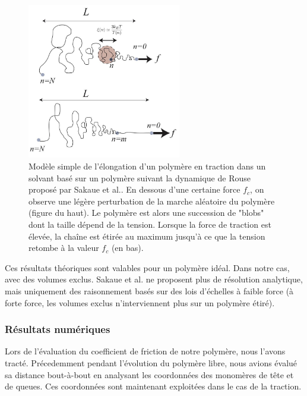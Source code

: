 \begin{figure}[H]
\begin{center}
\includegraphics[width=0.6\textwidth]{sakauetraction.jpg}
\caption[Traction d'un polymère]{Modèle simple de l'élongation d'un polymère en traction dans un solvant basé sur un polymère suivant la dynamique de Rouse proposé par Sakaue et al.\cite{Sakaue2012}. En dessous d'une certaine force $f_c$, on observe une légère perturbation de la marche aléatoire du polymère (figure du haut). Le polymère est alors une succession de "blobs" dont la taille dépend de la tension. Lorsque la force de traction est élevée, la chaîne est étirée au maximum jusqu'à ce que la tension retombe à la valeur $f_c$ (en bas).}
\label{sakauetraction}
\end{center}
\end{figure}

Ces résultats théoriques sont valables pour un polymère idéal. Dans notre cas, avec des volumes exclus. Sakaue et al. \cite{Sakaue2012} ne proposent plus de résolution analytique, mais uniquement des raisonnement basés sur des lois d'échelles à faible force (à forte force, les volumes exclus n'interviennent plus sur un polymère étiré).

\subsubsection{Résultats numériques}

Lors de l'évaluation du coefficient de friction de notre polymère, nous l'avons tracté. Précedemment pendant l'évolution du polymère libre, nous avions évalué sa distance bout-à-bout en analysant les coordonnées des monomères de tête et de queues. Ces coordonnées sont maintenant exploitées dans le cas de la traction. 


